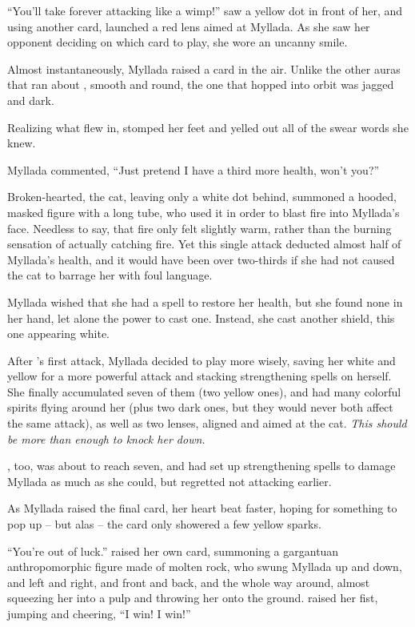 ``You'll take forever attacking like a wimp!'' \yronsyncra{} saw a yellow dot in front of her, and using another card, launched a red lens aimed at Myllada. As she saw her opponent deciding on which card to play, she wore an uncanny smile.

Almost instantaneously, Myllada raised a card in the air. Unlike the other auras that ran about \yronsyncra, smooth and round, the one that hopped into orbit was jagged and dark.

Realizing what flew in, \yronsyncra{} stomped her feet and yelled out all of the swear words she knew.

Myllada commented, ``Just pretend I have a third more health, won't you?''

Broken-hearted, the cat, leaving only a white dot behind, summoned a hooded, masked figure with a long tube, who used it in order to blast fire into Myllada's face. Needless to say, that fire only felt slightly warm, rather than the burning sensation of actually catching fire. Yet this single attack deducted almost half of Myllada's health, and it would have been over two-thirds if she had not caused the cat to barrage her with foul language.

Myllada wished that she had a spell to restore her health, but she found none in her hand, let alone the power to cast one. Instead, she cast another shield, this one appearing white.

\centeredstars

After \yronsyncra's first attack, Myllada decided to play more wisely, saving her white and yellow for a more powerful attack and stacking strengthening spells on herself. She finally accumulated seven of them (two yellow ones), and had many colorful spirits flying around her (plus two dark ones, but they would never both affect the same attack), as well as two lenses, aligned and aimed at the cat. \emph{This should be more than enough to knock her down.}

\yronsyncra, too, was about to reach seven, and had set up strengthening spells to damage Myllada as much as she could, but regretted not attacking earlier.

As Myllada raised the final card, her heart beat faster, hoping for something to pop up -- but alas -- the card only showered a few yellow sparks.

``You're out of luck.'' \yronsyncra{} raised her own card, summoning a gargantuan anthropomorphic figure made of molten rock, who swung Myllada up and down, and left and right, and front and back, and the whole way around, almost squeezing her into a pulp and throwing her onto the ground. \yronsyncra{} raised her fist, jumping and cheering, ``I win! I win!''

